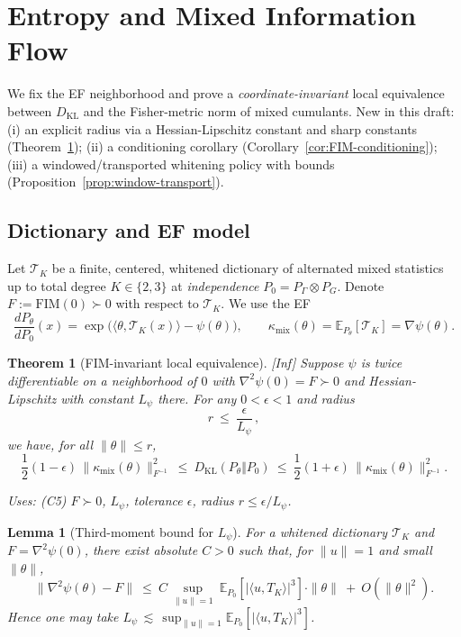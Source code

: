 \documentclass[10pt]{article}
\newcommand{\uses}[1]{\par\smallskip\noindent\textit{Uses: }#1\par\smallskip}
\newtheorem{lemma}{Lemma}
\newtheorem{theorem}{Theorem}
\begin{document}
\section{Entropy and Mixed Information Flow}\label{sec:entropy}

We fix the EF neighborhood and prove a \emph{coordinate-invariant} local equivalence between $D_{\mathrm{KL}}$ and the Fisher-metric norm of mixed cumulants. New in this draft:
(i) an explicit radius via a Hessian-Lipschitz constant and sharp constants (Theorem~\ref{thm:FIMbound});
(ii) a conditioning corollary (Corollary~\ref{cor:FIM-conditioning});
(iii) a windowed/transported whitening policy with bounds (Proposition~\ref{prop:window-transport}).

\setcounter{theorem}{1}

\subsection{Dictionary and EF model}

Let $\mathcal T_K$ be a finite, centered, whitened dictionary of alternated mixed statistics up to total degree $K\in\{2,3\}$ at \emph{independence} $P_0=P_\Gamma\otimes P_G$. Denote $F:=\mathrm{FIM}(0)\succ0$ with respect to $\mathcal T_K$. We use the EF
\[
\frac{dP_\theta}{dP_0}(x)=\exp\big(\langle \theta,\mathcal T_K(x)\rangle-\psi(\theta)\big),\qquad
\kappa_{\mathrm{mix}}(\theta)=\mathbb E_{P_\theta}[\mathcal T_K]=\nabla\psi(\theta).
\]

\begin{theorem}[FIM-invariant local equivalence]\label{thm:FIMbound}
\emph{[\textup{Inf}]} Suppose $\psi$ is twice differentiable on a neighborhood of $0$ with $\nabla^2\psi(0)=F\succ0$ and Hessian-Lipschitz with constant $L_\psi$ there. For any $0<\epsilon<1$ and radius
\[
r\ \le\ \frac{\epsilon}{L_\psi}\,,
\]
we have, for all $\|\theta\|\le r$,
\[
\frac12(1-\epsilon)\,\|\kappa_{\mathrm{mix}}(\theta)\|_{F^{-1}}^{2}
\ \le\ D_{\mathrm{KL}}(P_\theta\Vert P_0)\
\le\ \frac12(1+\epsilon)\,\|\kappa_{\mathrm{mix}}(\theta)\|_{F^{-1}}^{2}.
\]
\uses{(C5) $F\succ0$, $L_\psi$, tolerance $\epsilon$, radius $r\le \epsilon/L_\psi$.}
\end{theorem}

\begin{lemma}[Third-moment bound for $L_\psi$]\label{lem:Lpsi-3rd}
For a whitened dictionary $\mathcal T_K$ and $F=\nabla^2\psi(0)$, there exist absolute $C>0$ such that, for $\|u\|=1$ and small $\|\theta\|$,
\[
\big\|\nabla^2\psi(\theta)-F\big\|\ \le\ C\,\sup_{\|u\|=1}\ \mathbb E_{P_0}\!\left[\big|\langle u, T_K\rangle\big|^3\right]\cdot\|\theta\|\ +\ O(\|\theta\|^2).
\]
Hence one may take $L_\psi \,\lesssim\, \sup_{\|u\|=1}\mathbb E_{P_0}[|\langle u,T_K\rangle|^3]$.
\end{lemma}
\end{document}
